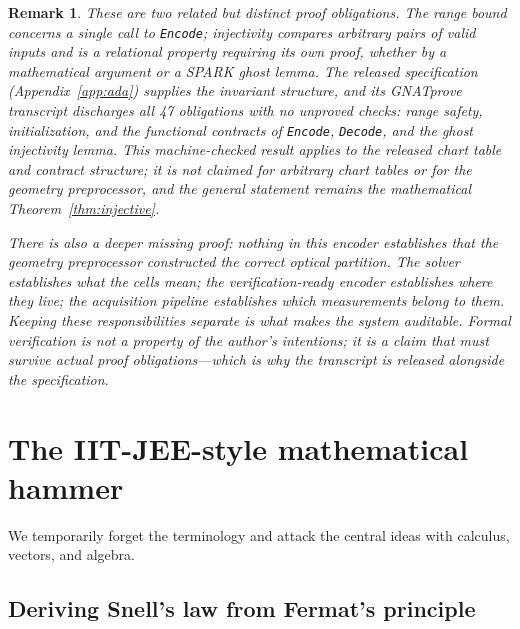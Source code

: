 \documentclass[11pt]{article}
\newtheorem{remark}[theorem]{Remark}
\begin{document}
\begin{remark}
These are two related but distinct proof obligations. The range bound concerns a single
call to \texttt{Encode}; injectivity compares arbitrary pairs of valid inputs and is a
\emph{relational} property requiring its own proof, whether by a mathematical argument
or a SPARK ghost lemma. The released specification (Appendix~\ref{app:ada}) supplies
the invariant structure, and its GNATprove transcript discharges all 47 obligations
with no unproved checks: range safety, initialization, and the functional contracts of
\texttt{Encode}, \texttt{Decode}, and the ghost injectivity lemma. This machine-checked
result applies to the released chart table and contract structure; it is not claimed
for arbitrary chart tables or for the geometry preprocessor, and the general statement
remains the mathematical Theorem~\ref{thm:injective}.

There is also a deeper missing proof: nothing in this encoder establishes that the
geometry preprocessor constructed the correct optical partition. The solver establishes
what the cells mean; the verification-ready encoder establishes where they live; the
acquisition pipeline establishes which measurements belong to them. Keeping these
responsibilities separate is what makes the system auditable. Formal verification is
not a property of the author's intentions; it is a claim that must survive actual proof
obligations---which is why the transcript is released alongside the specification.
\end{remark}

\section{The IIT-JEE-style mathematical hammer}\label{sec:hammer}

We temporarily forget the terminology and attack the central ideas with calculus,
vectors, and algebra.

\subsection{Deriving Snell's law from Fermat's principle}
\end{document}
